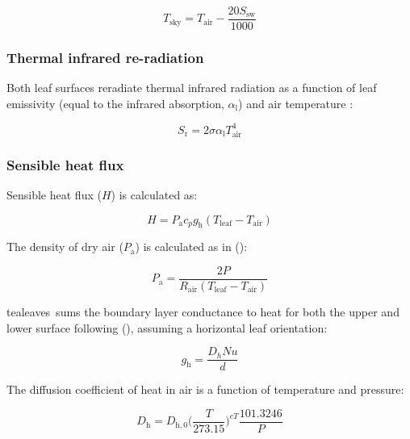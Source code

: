 \documentclass[11pt, oneside]{article}
\newcommand{\pkg}[1]{{\fontseries{b}\selectfont #1}}
\newcommand{\tealeaves}{\pkg{tealeaves}}
\begin{document}
\begin{equation}
  T_\mathrm{sky} = T_\mathrm{air} - \frac{20 S_\mathrm{sw}}{1000}
\end{equation}

\subsubsection*{Thermal infrared re-radiation}

Both leaf surfaces reradiate thermal infrared radiation as a function of leaf emissivity (equal to the infrared absorption, $\alpha_\mathrm{l}$) and air temperature \citep{Foster_Smith_1986, Okajima_etal_2012}:

\begin{equation}
  S_\mathrm{r} = 2 \sigma \alpha_\mathrm{l} T_\mathrm{air} ^ 4
\end{equation}
  
\subsubsection*{Sensible heat flux}
 
Sensible heat flux ($H$) is calculated as:

\begin{equation}
  H = P_\mathrm{a} c_p g_\mathrm{h} (T_\mathrm{leaf} - T_\mathrm{air})
\end{equation}

The density of dry air ($P_\mathrm{a}$) is calculated as in \citeauthor{Foster_Smith_1986} (\citeyear{Foster_Smith_1986}):

\begin{equation}
  P_\mathrm{a} = \frac{2 P}{R_\mathrm{air} (T_\mathrm{leaf} - T_\mathrm{air})}
\end{equation}

\tealeaves~sums the boundary layer conductance to heat for both the upper and lower surface following \citeauthor{Foster_Smith_1986} (\citeyear{Foster_Smith_1986}), assuming a horizontal leaf orientation:

\begin{equation} \label{eq:g_h}
  g_\mathrm{h} = \frac{D_h \mathit{Nu}}{d}
\end{equation}

The diffusion coefficient of heat in air is a function of temperature and pressure:

\begin{equation} \label{eq:D_x}
    D_\mathrm{h} = D_\mathrm{h,0} \Big(\frac{T}{273.15}\Big) ^ {\mathit{eT}} \frac{101.3246}{P}
\end{equation}
\end{document}
